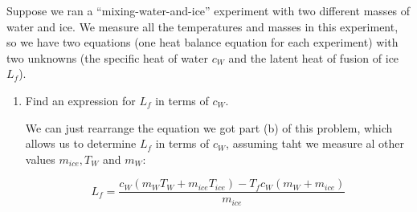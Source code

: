 \documentclass[10pt]{article}
\begin{document}
    Suppose we ran a ``mixing-water-and-ice'' experiment with two different masses of water and ice. We measure all the temperatures and masses in this experiment, so we have two equations (one heat balance equation for each experiment) with two unknowns (the specific heat of water $c_W$ and the latent heat of fusion of ice $L_f$).

    \begin{enumerate}[resume, label=\alph*)]
        \item Find an expression for $L_f$ in terms of $c_W$.
        
        \begin{solution}
            We can just rearrange the equation we got part (b) of this problem, which allows us to determine $L_f$ in terms of $c_W$, assuming taht we measure al other values $m_{ice}, T_W$ and $m_W$: 

            \[ L_f = \frac{c_W(m_WT_W + m_{ice}T_{ice}) - T_fc_W(m_W + m_{ice})}{m_{ice}}\]
        \end{solution}
    \end{enumerate}
\end{document}
